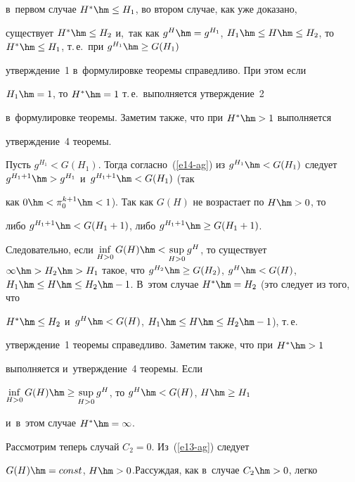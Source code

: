 в~первом случае $H^*\hm\leq H_1$, во втором случае, как уже доказано, 


существует $H^*\hm\leq H_2$ и,~так как $g^H\hm=  g^{H_1}$, $H_1\hm\leq 


H\hm\leq H_2$, то $H^*\hm\leq H_1$, т.\,е.\ при $g^{H_1}\hm\geq G(H_1)$ 


утверждение~1 в~формулировке теоремы справедливо. При этом если 


$H_1\hm=1$, то $H^*\hm=1$ т.\,е.\ выполняется утверждение~2 


в~формулировке теоремы. Заметим также, что при $H^*\hm>1$ выполняется 


утверждение~4 теоремы.


  


  Пусть $g^{H_1}< G(H_1)$. Тогда согласно~(\ref{e14-ag}) из $g^{H_1}\hm< 


G(H_1)$ следует $g^{H_1+1}\hm> g^{H_1}$ и~$g^{H_1+1}\hm< G(H_1)$ (так 


как $0\hm< \pi_0^{k+1}\hm<1$). Так как $G(H)$ не возрастает по $H\hm>0$, то 


либо $g^{H_1+1}\hm< G(H_1+1)$, либо $g^{H_1+1} \hm\geq G(H_1+1)$. 


Следовательно, если $\mathop{\mathrm{inf}}\limits_{H>0} G(H) \hm < 


\mathop{\mathrm{sup}}\limits_{H>0} g^H$, то существует $\infty\hm> H_2\hm> 


H_1$ такое, что $g^{H_2}\hm\geq G(H_2)$, $g^H\hm< G(H)$, $H_1\hm\leq 


H\hm\leq H_2\hm-1$. В~этом случае $H^*\hm=H_2$ (это следует из того, что 


$H^*\hm\leq H_2$ и~$g^H\hm< G(H)$, $H_1\hm\leq H\hm\leq H_2\hm-1$), т.\,е.\ 


утверждение~1 теоремы справедливо. Заметим также, что при $H^*\hm>1$ 


выполняется и~утверждение~4 теоремы. Если 


$\mathop{\mathrm{inf}}\limits_{H>0} G(H) \hm\geq 


\mathop{\mathrm{sup}}\limits_{H>0} g^H$, то $g^H\hm< G(H)$, $H\hm\geq H_1$ 


и~в~этом случае $H^*\hm=\infty$. 


  


  Рассмотрим теперь случай $C_2=0$. Из~(\ref{e13-ag}) следует 


$G(H)\hm=const$, $H\hm>0$.\linebreak Рассуждая, как в~случае $C_2\hm>0$, легко 


